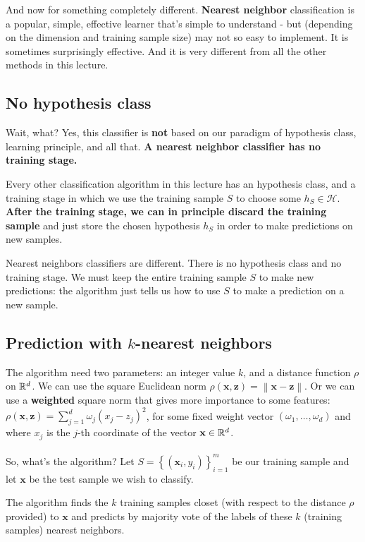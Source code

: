 \documentclass[11pt]{article}
\newcommand{\norm}[1]{\left\| #1\right\|}
\newcommand{\Hc}{\mathcal{H}}
\newcommand{\VV}[1]{\mathbf{#1}}
\begin{document}
And now for something completely different. {\bf Nearest neighbor}
classification is a popular, simple, effective learner that's simple to
understand - but (depending on the dimension and training sample size) may not so easy to implement. 
It is sometimes surprisingly
effective. And it is very different from all the other methods in this lecture.

\subsection{No hypothesis class}

Wait, what? 
Yes, this classifier is {\bf not} based
on our paradigm of hypothesis class, learning principle, and all that. {\bf A nearest
neighbor classifier has no training stage.} 

Every other classification algorithm in this lecture has an hypothesis class,
and a training stage in which we use the training sample $S$ to choose
some $h_S\in\Hc$. {\bf After the training stage, we can in principle discard  the
training sample} and just store the chosen hypothesis $h_S$ in order to make
predictions on new samples. 

Nearest neighbors classifiers are different. There is no hypothesis class and no
training stage. We must keep the entire training sample $S$ to make new
predictions: the algorithm just tells us how to use $S$ to make a prediction on
a new sample. 

\subsection{Prediction with $k$-nearest neighbors}

The algorithm need two parameters: an integer value $k$, and a distance function
$\rho$ on $\mathbb{R}^d$. We can use the square Euclidean norm $\rho(\VV{x},\VV{z}) = 
\norm{\VV{x}-\VV{z}}$. Or we can use a {\bf weighted} square norm that gives more
importance to some features: $\rho(\VV{x},\VV{z}) = \sum_{j=1}^d \omega_j
(x_j-z_j)^2$, for some fixed weight vector $(\omega_1,\ldots,\omega_d)$ and
where $x_j$ is the $j$-th coordinate of the vector $\VV{x}\in\reals^d$. 
 \\~\\
So, what's the algorithm? Let $S=\left\{ (\VV{x}_i,y_i) \right\}_{i=1}^m$ be our
training sample and let $\VV{x}$ be the test sample we wish to classify. 

The algorithm finds the $k$ training samples closet (with respect to the
distance $\rho$ provided) to $\VV{x}$ and predicts by majority vote of the labels
of  these $k$ (training samples) 
nearest neighbors.
\end{document}

